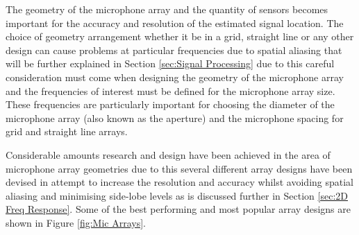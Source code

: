 \documentclass{UoNMCHA}
\numberwithin{equation}{section}
\begin{document}
    The geometry of the microphone array and the quantity of sensors becomes important for the accuracy and resolution of the estimated signal location. The choice of geometry arrangement whether it be in a grid, straight line or any other design can cause problems at particular frequencies due to spatial aliasing that will be further explained in Section \ref{sec:Signal Processing} due to this careful consideration must come when designing the geometry of the microphone array and the frequencies of interest must be defined for the microphone array size. These frequencies are particularly important for choosing the diameter of the microphone array (also known as the aperture) and the microphone spacing for grid and straight line arrays.
    
    Considerable amounts research and design have been achieved in the area of microphone array geometries due to this several different array designs have been devised in attempt to increase the resolution and accuracy whilst avoiding spatial aliasing and minimising side-lobe levels as is discussed further in Section \ref{sec:2D Freq Response}. Some of the best performing and most popular array designs are shown in Figure \ref{fig:Mic Arrays}.
    
\end{document}
